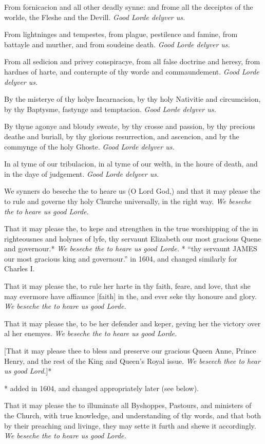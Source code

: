 From fornicacion and all other deadly synne: and frome all the deceiptes
of the worlde, the Fleshe and the Devill.
\emph{Good
Lorde delyver us.}

From lightninges and tempestes, from plague, pestilence and famine, from
battayle and murther, and from soudeine death.
\emph{Good
Lorde delyver us.}

From all sedicion and privey conspiracye, from all false doctrine and
heresy, from hardnes of harte, and conternpte of thy worde and commaundement.
\emph{Good
Lorde delyver us.}

By the misterye of thy holye Incarnacion, by thy holy Nativitie and circumcision,
by thy Baptysme, fastynge and temptacion.
\emph{Good
Lorde delyver us.}

By thyne agonye and bloudy sweate, by thy crosse and passion, by thy precious
deathe and buriall, by thy glorious resurrection, and ascencion, and by
the commynge of the holy Ghoste.
\emph{Good
Lorde delyver us.}

In al tyme of our tribulacion, in al tyme of our welth, in the houre of
death, and in the daye of judgement.
\emph{Good
Lorde delyver us.}

We synners do beseche the to heare us (O Lord God,) and that it may please
the to rule and governe thy holy Churche universally, in the right way.
\emph{We
beseche the to heare us good Lorde.}

That it may please the, to kepe and strengthen in the true worshipping
of the in righteousnes and holynes of lyfe, thy servaunt Elizabeth our
most gracious Quene and governour.*
\emph{We
beseche the to heare us good Lorde.} *
``thy servaunt JAMES our most gracious king and
governour.'' in
1604, and changed similarly for Charles I.

That it may please the, to rule her harte in thy faith, feare, and love,
that she may evermore have affiaunce [faith]
in the, and ever seke thy honoure and glory.
\emph{We
beseche the to heare us good Lorde.}

That it may please the, to be her defender and keper, geving her the victory
over al her enemyes.
\emph{We
beseche the to heare us good Lorde.}

[That
it may please thee to bless and preserve our gracious Queen Anne, Prince
Henry, and the rest of the King and Queen's Royal issue.
\emph{We beseech thee to hear us good Lord.}]*

*
added in 1604, and changed appropriately later (see
below).

That it may please the to illuminate all Byshoppes, Pastours, and ministers
of the Church, with true knowledge, and understanding of thy words, and
that both by their preaching and livinge, they may sette it furth and
shewe it accordingly.
\emph{We
beseche the to heare us good Lorde.}

